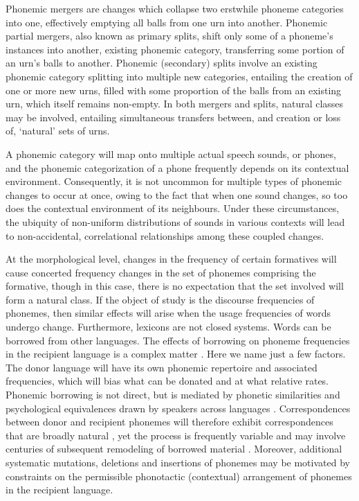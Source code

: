 Phonemic mergers \autocite{hoenigswald1965language} are changes which collapse two erstwhile phoneme categories into one, effectively emptying all balls from one urn into another. Phonemic partial mergers, also known as primary splits, shift only some of a phoneme's instances into another, existing phonemic category, transferring some portion of an urn's balls to another. Phonemic (secondary) splits involve an existing phonemic category splitting into multiple new categories, entailing the creation of one or more new urns, filled with some proportion of the balls from an existing urn, which itself remains non-empty. In both mergers and splits, natural classes may be involved, entailing simultaneous transfers between, and creation or loss of, `natural' sets of urns.

A phonemic category will map onto multiple actual speech sounds, or phones, and the phonemic categorization of a phone frequently depends on its contextual environment. Consequently, it is not uncommon for multiple types of phonemic changes to occur at once, owing to the fact that when one sound changes, so too does the contextual environment of its neighbours. Under these circumstances, the ubiquity of non-uniform distributions of sounds in various contexts will lead to non-accidental, correlational relationships among these coupled changes.

At the morphological level, changes in the frequency of certain formatives will cause concerted frequency changes in the set of phonemes comprising the formative, though in this case, there is no expectation that the set involved will form a natural class. If the object of study is the discourse frequencies of phonemes, then similar effects will arise when the usage frequencies of words undergo change. Furthermore, lexicons are not closed systems. Words can be borrowed from other languages. The effects of borrowing on phoneme frequencies in the recipient language is a complex matter \autocite{boretzky1991contact}. Here we name just a few factors. The donor language will have its own phonemic repertoire and associated frequencies, which will bias what can be donated and at what relative rates. Phonemic borrowing is not direct, but is mediated by phonetic similarities and psychological equivalences drawn by speakers across languages \autocites{flege1987production}{kang2003perceptual}. Correspondences between donor and recipient phonemes will therefore exhibit correspondences that are broadly natural \autocite{paradis1997preservation}, yet the process is frequently variable \autocite{lev2014effect} and may involve centuries of subsequent remodeling of borrowed material \autocite{crawford_adaptation_2009}. Moreover, additional systematic mutations, deletions and insertions of phonemes may be motivated by constraints on the permissible phonotactic (contextual) arrangement of phonemes in the recipient language.

